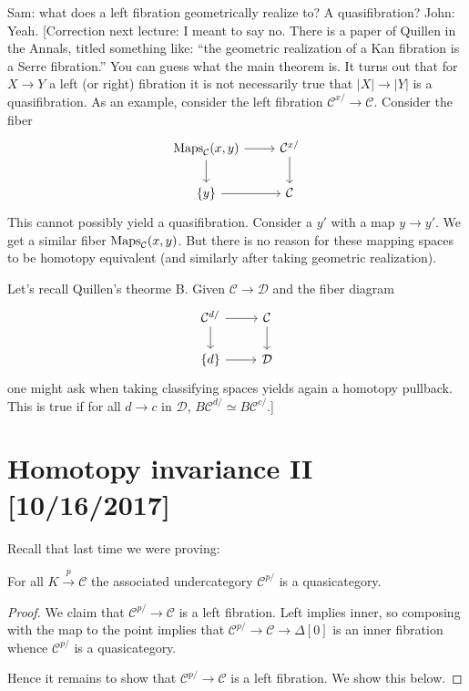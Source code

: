 \documentclass{amsart}
\begin{document}
Sam: what does a left fibration geometrically realize to? A quasifibration? John: Yeah.
[Correction next lecture: I meant to say no. There is a paper of Quillen in the Annals,
    titled something like: ``the geometric realization of a Kan fibration is a Serre fibration.''
    You can guess what the main theorem is. It turns out that for $X\to Y$ a left (or right)
    fibration it is not necessarily true that $|X|\to |Y|$ is a quasifibration. As an
    example, consider the left fibration $\mathcal{C}^{x/}\to\mathcal{C}$. Consider the fiber
    \begin{equation*}
        \begin{tikzcd}
            \Maps_{\mathcal{C}}(x,y) \rar\dar & \mathcal{C}^{x/}\dar \\
            \{y\} \rar & \mathcal{C}
        \end{tikzcd}
    \end{equation*}
    This cannot possibly yield a quasifibration. Consider a $y'$ with a map
    $y\to y'$. We get a similar fiber $\operatorname{Maps}_{\mathcal{C}}(x,y)$.
    But there is no reason for these mapping spaces to be homotopy equivalent
    (and similarly after taking geometric realization).

    Let's recall Quillen's theorme B. Given $\mathcal{C}\to \mathcal{D}$ and
    the fiber diagram
    \begin{equation*}
        \begin{tikzcd}
            \mathcal{C}^{d/} \rar\dar & \mathcal{C}\dar\\
            \{d\} \rar & \mathcal{D}
        \end{tikzcd}
    \end{equation*}
    one might ask when taking classifying spaces yields again a homotopy pullback.
    This is true if for all $d\to c$ in $\mathcal{D}$, $B\mathcal{C}^{d/}\simeq B\mathcal{C}^{c/}$.]

\newpage

\section{Homotopy invariance II [10/16/2017]}

Recall that last time we were proving:
\begin{corollary}[HTT 2.1.2.2]
    For all $K\xrightarrow{p}\mathcal{C}$ the associated undercategory $\mathcal{C}^{p/}$ is a quasicategory.
\end{corollary}
\begin{proof}
    We claim that $\mathcal{C}^{p/}\to \mathcal{C}$ is a left fibration. Left implies inner, so
    composing with the map to the point implies that $\mathcal{C}^{p/}\to \mathcal{C}\to \Delta[0]$
    is an inner fibration whence $\mathcal{C}^{p/}$ is a quasicategory.
    
    Hence it remains to show that $\mathcal{C}^{p/}\to \mathcal{C}$ is a left fibration.
    We show this below.
\end{proof}
\end{document}
